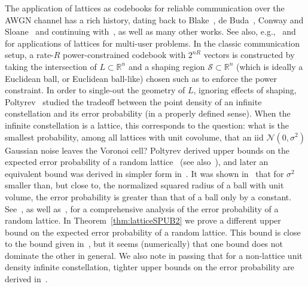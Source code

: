 \documentclass[article,doublecolumn]{IEEEtran}
\newcommand{\R}{{\mathbb{R}}}
\newcommand{\SSS}{{\mathcal{S}}}
\begin{document}
The application of lattices as codebooks for reliable communication over the AWGN channel has a rich history, dating back to Blake~\cite{blake1971leech}, de Buda~\cite{deBuda75}, Conway and Sloane~\cite{cs83VorCodes} and continuing with~\cite{forney1988cosetI,forney1988cosetII,Forney89II,poltyrev94AWGN,loeliger97,urbanke1998lattice,linder2002corrected,erez2004achieving,urietal,swannack2005,LMK06,izf12,ordentlich2016simple}, as well as many other works. See also, e.g.,~\cite{zamir2002nested,kochman2009joint,nazer2011compute,ordentlich2014approximate} and~\cite[Chapter 12]{ramibook} for applications of lattices for multi-user problems. In the classic communication setup, a rate-$R$ power-constrained codebook with $2^{nR}$ vectors is constructed by taking the intersection of $L\subset\R^n$ and a shaping region $\SSS\subset \R^n$ (which is ideally a Euclidean ball, or Euclidean ball-like) chosen such as to enforce the power constraint. In order to single-out the geometry of $L$, ignoring effects of shaping, Poltyrev~\cite{poltyrev94AWGN} studied the tradeoff between the point density of an infinite constellation and its error probability (in a properly defined sense). When the infinite constellation is a lattice, this corresponds to the question: what is the smallest probability, among all lattices with unit covolume, that an iid $\mathcal{N}(0,\sigma^2)$ Gaussian noise leaves the Voronoi cell? Poltyrev derived upper bounds on the expected error probability of a random lattice~\cite{poltyrev94AWGN} (see also~\cite{loeliger97}), and later an equivalent bound was derived in simpler form in~\cite{izf12}. It was shown in~\cite{izf12} that for $\sigma^2$ smaller than, but close to, the normalized squared radius of a ball with unit volume, the error probability is greater than that of a ball only by a constant. See~\cite[Chapter 13]{ramibook}, as well as~\cite{IZ12}, for a comprehensive analysis of the error probability of a random lattice. In Theorem~\ref{thm:latticeSPUB2} we prove a different upper bound on the expected error probability of a random lattice. This bound is close to the bound given in~\cite{izf12}, but it seems (numerically) that one bound does not dominate the other in general. We also note in passing that for a non-lattice unit density infinite constellation, tighter upper bounds on the error probability are derived in~\cite{anantharam2015capacity}.

\medskip
\end{document}
